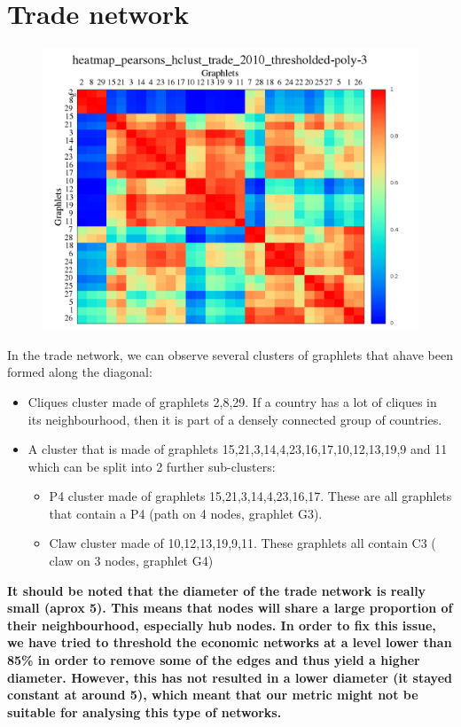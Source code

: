 \documentclass[11pt,a4paper,oneside]{report}
\begin{document}
\section*{Trade network}

\begin{figure}[H]
  \centering
\includegraphics[scale=0.4]
{../code/final_results/trade_2010_thresholded/heatmap_pearsons_hclust_trade_2010_thresholded-poly-3.png}
\caption{}
\label{fig:trade}
\end{figure}

In the trade network, we can observe several clusters of graphlets that ahave been formed along the diagonal:
\begin{itemize}
 \item Cliques cluster made of graphlets 2,8,29. If a country has a lot of cliques in its neighbourhood, then it is part of a densely connected group of countries. 
 \item A cluster that is made of graphlets 15,21,3,14,4,23,16,17,10,12,13,19,9 
 and 11 which can be split into 2 further sub-clusters: 
    \begin{itemize}
     \item P4 cluster made of graphlets 15,21,3,14,4,23,16,17. These are all 
     graphlets that contain a P4 (path on 4 nodes, graphlet G3). 
     \item Claw cluster made of 10,12,13,19,9,11. These graphlets all contain C3 ( claw on 3 nodes, graphlet G4)
    \end{itemize}
\end{itemize}

\textbf{It should be noted that the diameter of the trade network is really small (aprox 5). This means that nodes will share a large proportion of their neighbourhood, especially hub nodes. In order to fix this issue, we have tried to threshold the economic networks at a level lower than 85\% in order to remove some of the edges and thus yield a higher diameter. However, this has not resulted in a lower diameter (it stayed constant at around 5), which meant that our metric might not be suitable for analysing this type of networks.}
\end{document}
